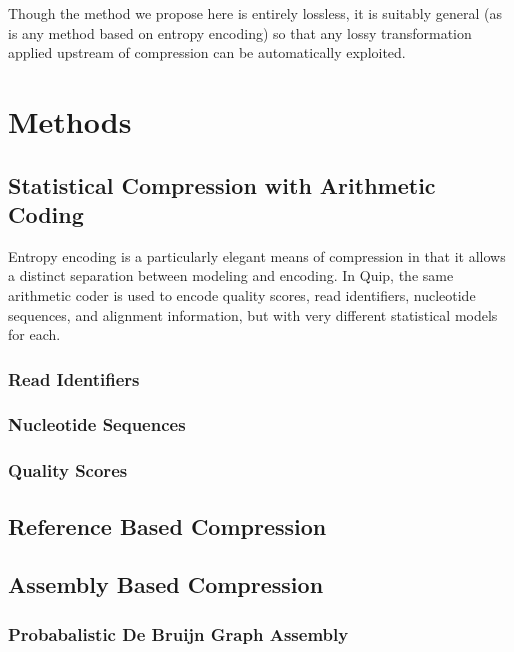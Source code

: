 \documentclass[twocolumn]{article}
\begin{document}


Though the method we propose here is entirely lossless, it is suitably general
(as is any method based on entropy encoding) so that any lossy transformation
applied upstream of compression can be automatically exploited.


\section{Methods}

\subsection{Statistical Compression with Arithmetic Coding}

Entropy encoding is a particularly elegant means of compression in that it
allows a distinct separation between modeling and encoding. In Quip, the same
arithmetic coder is used to encode quality scores, read identifiers,
nucleotide sequences, and alignment information, but with very different
statistical models for each.

\subsubsection{Read Identifiers}

\subsubsection{Nucleotide Sequences}

\subsubsection{Quality Scores}


\subsection{Reference Based Compression}

\subsection{Assembly Based Compression}



\subsubsection{Probabalistic De Bruijn Graph Assembly}
\end{document}
